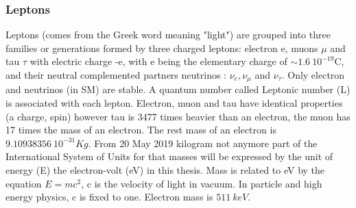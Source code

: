 \subsubsection{Leptons}
Leptons (comes from the Greek word meaning "light") are grouped into three families or generations formed by three charged leptons: electron e, muons $\mu$ and tau $\tau$ with electric charge -e, with e being the elementary charge of $\sim 1.6 \ 10^{-19} $C, and their neutral complemented partners neutrinos : $\nu_{e}, \nu_{\mu}$ and $\nu_{\tau}$. Only electron and neutrinos (in SM) are stable. A quantum number called Leptonic number (L) is associated with each lepton. Electron, muon and tau have identical properties (a charge, spin) however tau is 3477 times heavier than an electron, the muon has 17 times the mass of an electron. The rest mass of an electron is $9.10938356 \ 10^{-31} Kg$. From 20 May 2019 kilogram not anymore part of the International System of Units for that masses will be expressed by the unit of energy (E) the electron-volt (eV) in this thesis. Mass is related to eV by the equation $E=mc^2$, c is the velocity of light in vacuum. In particle and high energy physics, c is fixed to one. Electron mass is $511 \ keV$.
